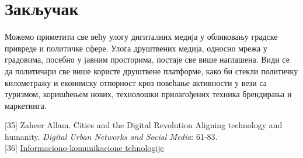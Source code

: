 \documentclass{article}
\begin{document}
\section{Закључак}
Можемо приметити све већу улогу дигиталних медија у
обликовању градске привреде и политичке сфере. Улога друштвених медија, односно мрежа у градовима, посебно у јавним просторима, постаје све више наглашена. Види се да политичари све више користе друштвене платформе, како би стекли политичку километражу и економску отпорност кроз повећање активности у вези са туризмом, коришћењем нових, технолошки прилагођених техника брендирања и маркетинга.

\newpage

 

\vspace{-7}
\bibitem{} [35] Zaheer Allam. Cities and the  Digital  Revolution Aligning technology and humanity. \emph{Digital Urban Networks and Social Media}: 61-83. \\

\vspace{-10}
\bibitem{} [36] \href{http://miticmirjana.weebly.com/104810501058-10901077109310851086108310861075108011121077.html}{Informaciono-komunikacione tehnologije}
\end{document}
